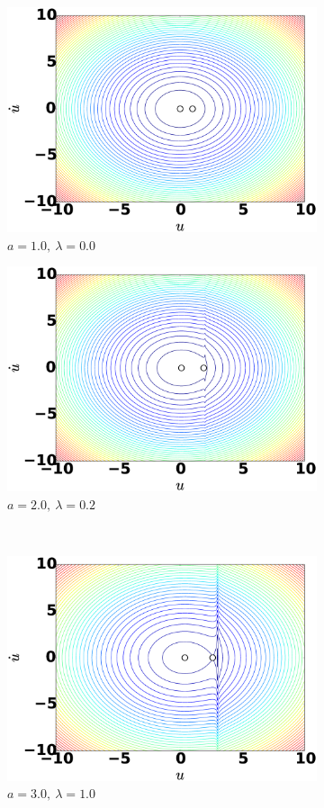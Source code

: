 \documentclass[14pt, a4paper]{extreport}
\begin{document}
\begin{figure}[H]
	\centering
	\begin{subfigure}[h]{8.0 cm}
		\includegraphics[width=8.0 cm]{figure/mechanical_a10_lambda0.eps}
		\caption{$a=1.0,\ \lambda = 0.0$}
	\end{subfigure}
	\begin{subfigure}[h]{8.0 cm}
        \includegraphics[width=8.0 cm]{figure/mechanical_a20_lambda2.eps}
		\caption{$a=2.0,\ \lambda = 0.2$}
    \end{subfigure}
    \\
    \begin{subfigure}[h]{8.0 cm}
		\includegraphics[width=8.0 cm]{figure/mechanical_a30_lambda10.eps}
		\caption{$a=3.0,\ \lambda = 1.0$}
	\end{subfigure}
	\begin{subfigure}[h]{8.0 cm}

\end{subfigure}
\end{figure}
\end{document}
